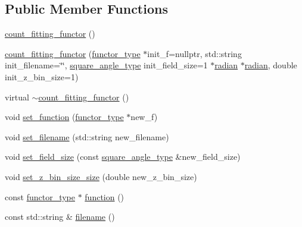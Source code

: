 \subsection*{Public Member Functions}
\begin{DoxyCompactItemize}
\item 
\hyperlink{classIceBRG_1_1count__fitting__functor_ab7dc64ad092fc074141479f3666a9aee}{count\+\_\+fitting\+\_\+functor} ()
\item 
\hyperlink{classIceBRG_1_1count__fitting__functor_ae65d78957fb615402de9e542fbfe53bc}{count\+\_\+fitting\+\_\+functor} (\hyperlink{classIceBRG_1_1count__fitting__functor_a681f2697a3ad0a5aa13882f0fba0e170}{functor\+\_\+type} $\ast$init\+\_\+f=nullptr, std\+::string init\+\_\+filename=\char`\"{}\char`\"{}, \hyperlink{namespaceIceBRG_af4db0ce6eb1c82d5b5bc58d9467676ea}{square\+\_\+angle\+\_\+type} init\+\_\+field\+\_\+size=1 $\ast$\hyperlink{namespaceIceBRG_af78fec3f42ee23d596793328b8991468}{radian} $\ast$\hyperlink{namespaceIceBRG_af78fec3f42ee23d596793328b8991468}{radian}, double init\+\_\+z\+\_\+bin\+\_\+size=1)
\item 
virtual \hyperlink{classIceBRG_1_1count__fitting__functor_a6fb7fb4646ea0e7fca54a8663d2336be}{$\sim$count\+\_\+fitting\+\_\+functor} ()
\item 
void \hyperlink{classIceBRG_1_1count__fitting__functor_a4ddac394a07fc2c97dd9424088d93e8b}{set\+\_\+function} (\hyperlink{classIceBRG_1_1count__fitting__functor_a681f2697a3ad0a5aa13882f0fba0e170}{functor\+\_\+type} $\ast$new\+\_\+f)
\item 
void \hyperlink{classIceBRG_1_1count__fitting__functor_a306d2910021a49de54701d9b760716fb}{set\+\_\+filename} (std\+::string new\+\_\+filename)
\item 
void \hyperlink{classIceBRG_1_1count__fitting__functor_a9157659c3f62c4c8f174abbab2ef410c}{set\+\_\+field\+\_\+size} (const \hyperlink{namespaceIceBRG_af4db0ce6eb1c82d5b5bc58d9467676ea}{square\+\_\+angle\+\_\+type} \&new\+\_\+field\+\_\+size)
\item 
void \hyperlink{classIceBRG_1_1count__fitting__functor_aa403b820e17878432d88505a47b17b38}{set\+\_\+z\+\_\+bin\+\_\+size\+\_\+size} (double new\+\_\+z\+\_\+bin\+\_\+size)
\item 
const \hyperlink{classIceBRG_1_1count__fitting__functor_a681f2697a3ad0a5aa13882f0fba0e170}{functor\+\_\+type} $\ast$ \hyperlink{classIceBRG_1_1count__fitting__functor_a2358d05da15333f122fed12e54d68e89}{function} ()
\item 
const std\+::string \& \hyperlink{classIceBRG_1_1count__fitting__functor_aef06cb7ea01e1fce2486a0748660525e}{filename} ()

\end{DoxyCompactItemize}
